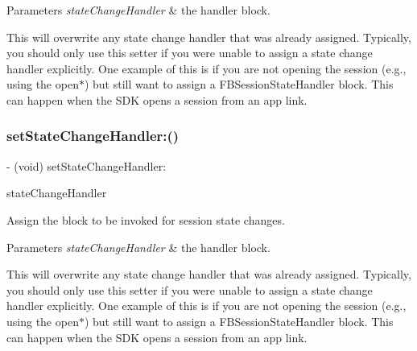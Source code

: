 \begin{DoxyParams}{Parameters}
{\em state\+Change\+Handler} & the handler block.\\
\hline
\end{DoxyParams}
This will overwrite any state change handler that was already assigned. Typically, you should only use this setter if you were unable to assign a state change handler explicitly. One example of this is if you are not opening the session (e.\+g., using the {\ttfamily open$\ast$}) but still want to assign a {\ttfamily F\+B\+Session\+State\+Handler} block. This can happen when the S\+DK opens a session from an app link. \mbox{\label{interfaceFBSession_a56e9467165f832f3151dadd14190868b}} 
\subsubsection{\texorpdfstring{set\+State\+Change\+Handler\+:()}{setStateChangeHandler:()}\hspace{0.1cm}{\footnotesize\ttfamily [3/5]}}
{\footnotesize\ttfamily -\/ (void) set\+State\+Change\+Handler\+: \begin{DoxyParamCaption}\item[{(F\+B\+Session\+State\+Handler)}]{state\+Change\+Handler }\end{DoxyParamCaption}}

Assign the block to be invoked for session state changes.


\begin{DoxyParams}{Parameters}
{\em state\+Change\+Handler} & the handler block.\\
\hline
\end{DoxyParams}
This will overwrite any state change handler that was already assigned. Typically, you should only use this setter if you were unable to assign a state change handler explicitly. One example of this is if you are not opening the session (e.\+g., using the {\ttfamily open$\ast$}) but still want to assign a {\ttfamily F\+B\+Session\+State\+Handler} block. This can happen when the S\+DK opens a session from an app link. \mbox{\label{interfaceFBSession_a56e9467165f832f3151dadd14190868b}} 
